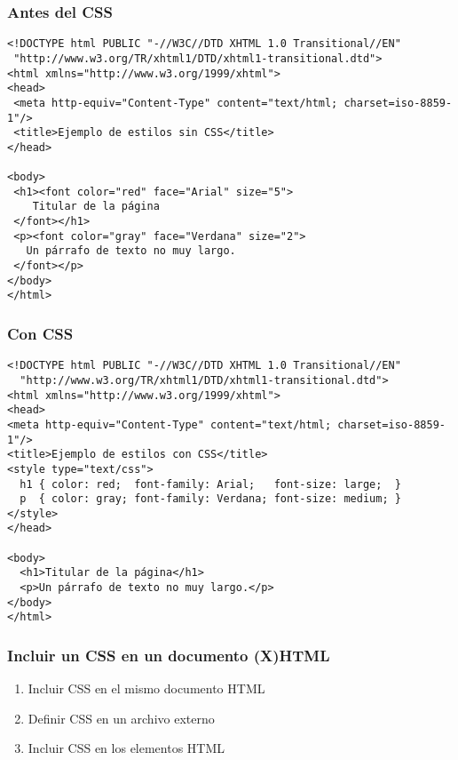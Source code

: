 
\begin{frame}[fragile]
\frametitle{Antes del CSS}

{\footnotesize
\begin{verbatim}
<!DOCTYPE html PUBLIC "-//W3C//DTD XHTML 1.0 Transitional//EN"
 "http://www.w3.org/TR/xhtml1/DTD/xhtml1-transitional.dtd">
<html xmlns="http://www.w3.org/1999/xhtml">
<head>
 <meta http-equiv="Content-Type" content="text/html; charset=iso-8859-1"/>
 <title>Ejemplo de estilos sin CSS</title>
</head>
 
<body>
 <h1><font color="red" face="Arial" size="5">
    Titular de la página
 </font></h1>
 <p><font color="gray" face="Verdana" size="2">
   Un párrafo de texto no muy largo.
 </font></p>
</body>
</html>
\end{verbatim}
}

\end{frame}


\begin{frame}[fragile]
\frametitle{Con CSS}

{\footnotesize
\begin{verbatim}
<!DOCTYPE html PUBLIC "-//W3C//DTD XHTML 1.0 Transitional//EN"
  "http://www.w3.org/TR/xhtml1/DTD/xhtml1-transitional.dtd">
<html xmlns="http://www.w3.org/1999/xhtml">
<head>
<meta http-equiv="Content-Type" content="text/html; charset=iso-8859-1"/>
<title>Ejemplo de estilos con CSS</title>
<style type="text/css">
  h1 { color: red;  font-family: Arial;   font-size: large;  }
  p  { color: gray; font-family: Verdana; font-size: medium; }
</style>
</head>
 
<body>
  <h1>Titular de la página</h1>
  <p>Un párrafo de texto no muy largo.</p>
</body>
</html>
\end{verbatim}
}

\end{frame}


\begin{frame}
\frametitle{Incluir un CSS en un documento (X)HTML}

\begin{enumerate}
  \item Incluir CSS en el mismo documento HTML
  \item Definir CSS en un archivo externo
  \item Incluir CSS en los elementos HTML
\end{enumerate}

\end{frame}

